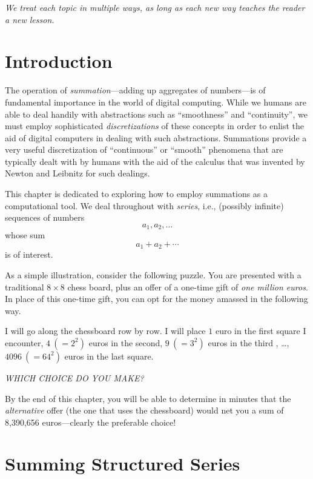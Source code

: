 {\em We treat each topic in multiple ways, as long as each new way
  teaches the reader a new lesson.}

\section{Introduction}
\label{sec:intro}

The operation of {\it summation}---adding up aggregates of
numbers---is of fundamental importance in the world of digital
computing.  While we humans are able to deal handily with abstractions
such as ``smoothness'' and ``continuity'', we must employ
sophisticated {\em discretizations} of these concepts in order to
enlist the aid of digital computers in dealing with such abstractions.
Summations provide a very useful discretization of ``continuous'' or
``smooth'' phenomena that are typically dealt with by humans with the
aid of the calculus that was invented by Newton and Leibnitz for such
dealings.

This chapter is dedicated to exploring how to employ summations as a
computational tool.  We deal throughout with {\it series}, i.e.,
(possibly infinite) sequences of numbers
\[ a_1, a_2, \ldots \]
whose sum
\[ a_1 + a_2 + \cdots \]
is of interest.

As a simple illustration, consider the following puzzle.  You are
presented with a traditional $8 \times 8$ chess board, plus an offer
of a one-time gift of {\em one million euros}.  In place of this
one-time gift, you can opt for the money amassed in the following
way.

\noindent
%
I will go along the chessboard row by row.  I will place $1$ euro in
the first square I encounter, $4 \ (= 2^2)$ euros in the second, $9
\ (= 3^2)$ euros in the third , \ldots, $4096 \ (= 64^2)$ euros in the
last square.

\noindent
{\em WHICH CHOICE DO YOU MAKE?}

\medskip

By the end of this chapter, you will be able to determine in minutes
that the {\em alternative} offer (the one that uses the chessboard)
would net you a sum of 8,390,656 euros---clearly the preferable
choice!



\section{Summing Structured Series}
\label{sec:structured-series}

